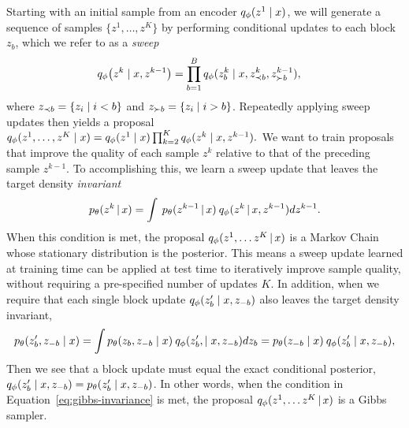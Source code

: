 \documentclass[anonymous=false, %
               format=acmsmall, %
               review=true, %
               screen=true, %
               nonacm=true]{acmart}
\theoremstyle{definition}
\begin{document}
Starting with an initial sample from an encoder $q_\phi(z^{1} \mid x)$, we will generate a sequence of samples $\{z^1, \ldots, z^K\}$ by performing conditional updates to each block $z_b$, which we refer to as a \emph{sweep}
\begin{align}
    \label{eq:approx-gibbs-kernel}
    q_\phi \big( z^k \mid x, z^{k-1} \big)
    &=
    \prod_{b=1}^B
    q_\phi(z^k_b \mid x, z^{k}_{\prec b}, z^{k-1}_{\succ b})
    ,
\end{align}
where $z_{\prec b} = \{z_i \mid i < b\}$ and $z_{\succ b} = \{z_i \mid i > b\}$. Repeatedly applying sweep updates then yields a proposal
$
    q_\phi(z^1, \ldots, z^K \mid x) 
    =
    q_\phi(z^1 \mid x)
    \prod_{k=2}^K
    q_\phi(z^k \mid x, z^{k-1}).
$
We want to train proposals that improve the quality of each sample $z^k$ relative to that of the preceding sample $z^{k-1}$. To accomplishing this, we learn a sweep update that leaves the target density \emph{invariant}
\begin{equation}
    \label{eq:kernel-invariance}
    p_\theta(z^k \,|\, x) = \int \: p_\theta(z^{k-1} \,|\, x) \: q_\phi(z^k \,|\,x, z^{k-1}) d z^{k-1}.
\end{equation}
When this condition is met, the proposal $q_\phi(z^1, \ldots z^K \,|\, x)$ is a Markov Chain whose stationary distribution is the posterior. 
This means a sweep update learned at training time can be applied at test time to iteratively improve sample quality, without requiring a pre-specified number of updates $K$. In addition, when we require that each single block update $q_\phi(z'_b \mid x, z_{-b})$ also leaves the target density invariant,
\begin{align}
    \label{eq:gibbs-invariance}
    p_\theta(z'_b, z_{-b} \mid x)
    = 
    \int 
    p_\theta(z_b, z_{-b} \mid x) \:
    q_\phi(z'_b, \mid x, z_{-b}) 
    dz_{b}
    = 
    p_\theta(z_{-b} \mid x) \:
    q_\phi(z'_b \mid x, z_{-b})
    ,
\end{align}
Then we see that a block update must equal the exact conditional posterior, $q_\phi(z'_b \mid x, z_{-b}) = p_\theta(z'_b \mid x, z_{-b})$.
In other words, when the condition in Equation~\ref{eq:gibbs-invariance} is met, the proposal $q_\phi(z^1, \ldots z^K \,|\, x)$ is a Gibbs sampler.
\end{document}
